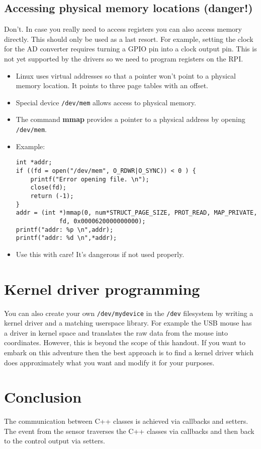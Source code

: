 \documentclass[12pt]{report}
\begin{document}
\subsection{Accessing physical memory locations (danger!)}

Don't.
In case you really need to access registers you can
also access memory directly. This should only be used as a last resort.
For example, setting the clock for the AD converter requires
turning a GPIO pin into a clock output pin. This is not yet
supported by the drivers so we need to program registers
on the RPI.
\begin{itemize}
\item Linux uses virtual addresses so that a pointer won't
point to a physical memory location. It points to three page
tables with an offset.
\item Special device \texttt{/dev/mem} allows access to physical
memory.
\item The command \textbf{mmap} provides a pointer to a physical
address by opening \texttt{/dev/mem}.
\item Example:
\begin{verbatim}
int *addr;
if ((fd = open("/dev/mem", O_RDWR|O_SYNC)) < 0 ) {
    printf("Error opening file. \n");
    close(fd);
    return (-1);
}
addr = (int *)mmap(0, num*STRUCT_PAGE_SIZE, PROT_READ, MAP_PRIVATE,
            fd, 0x0000620000000000);
printf("addr: %p \n",addr);
printf("addr: %d \n",*addr);
\end{verbatim}
\item Use this with care! It's dangerous if not used properly.
\end{itemize}


\section{Kernel driver programming}
You can also create your own \texttt{/dev/mydevice} in the \texttt{/dev} filesystem
by writing a kernel driver and a matching userspace library. For
example the USB mouse has a driver in kernel space and translates
the raw data from the mouse into coordinates. However,
this is beyond the scope of this handout. If you want to embark
on this adventure then the best approach is to
find a kernel driver which does approximately what you want and
modify it for your purposes.


\section{Conclusion}
The communication between C++ classes is achieved via
callbacks and setters. The event from the sensor traverses
the C++ classes via callbacks and then back to the control
output via setters.
\end{document}
